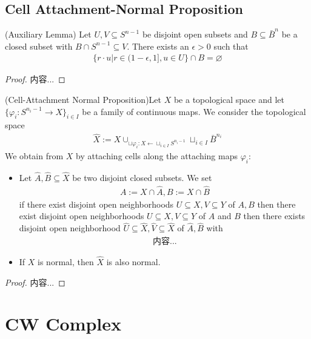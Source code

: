 \documentclass[Total.tex]{subfiles}
\begin{document}
	\subsection{Cell Attachment-Normal Proposition}
	\begin{lemma}
		(Auxiliary Lemma) Let $U,V\subseteq S^{n-1}$ be disjoint open subsets and $B\subseteq \bar{B}^n$ be a closed subset with $B\cap S^{n-1}\subseteq V$. There exists an $\epsilon>0$ such that
		\begin{gather*}
			\{r\cdot u|r\in (1-\epsilon,1],u\in U\}\cap B=\varnothing
		\end{gather*}
	\end{lemma}
	\begin{proof}
		内容...
	\end{proof}
	\begin{proposition}
		(Cell-Attachment Normal Proposition)Let $X$ be a topological space and let $\{\varphi_i:S^{n_i-1}\rightarrow X\}_{i\in I}$ be a family of continuous maps. We consider the topological space
		\begin{gather*}
			\hat{X}:=X\cup_{\sqcup \varphi_i:X\leftarrow \sqcup_{i\in I} S^{n_i-1}}\sqcup_{i\in I} \bar{B}^{n_i}
		\end{gather*}
		We obtain from $X$ by attaching cells along the attaching maps $\varphi_i$:
		\begin{itemize}
			\item Let $\hat{A},\hat{B}\subseteq \hat{X}$ be two disjoint closed subsets. We set
			\begin{gather*}
				A:=X\cap \hat{A},B:=X\cap \hat{B}
			\end{gather*}
			if there exist disjoint open neighborhoods $U\subseteq X,V\subseteq Y$ of $A,B$ then there exist disjoint open neighborhoods $U\subseteq X,V\subseteq Y$ of $A$ and $B$ then there exists disjoint open neighborhood $\hat{U}\subseteq \hat{X},\hat{V}\subseteq \hat{X}$ of $\hat{A},\hat{B}$ with 
			\begin{gather*}
				内容...
			\end{gather*}
			\item If $X$ is normal, then $\hat{X}$ is also normal.
		\end{itemize}
	\end{proposition}
	\begin{proof}
		内容...
	\end{proof}
	\section{CW Complex}
\end{document}
